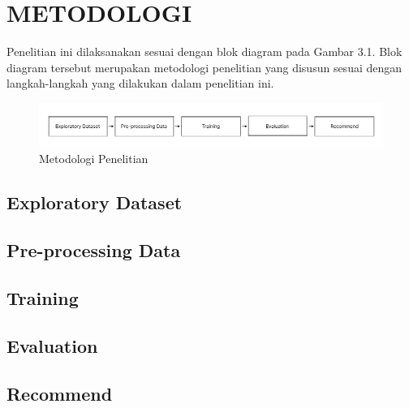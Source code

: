 \section{METODOLOGI}

Penelitian ini dilaksanakan sesuai dengan blok diagram pada Gambar 3.1. Blok diagram tersebut
merupakan metodologi penelitian yang disusun sesuai dengan langkah-langkah yang dilakukan dalam penelitian ini.

\begin{figure} [ht] \centering
  \includegraphics[width=160mm]{gambar/metodologi.png}
  \caption{Metodologi Penelitian}
\end{figure}


\subsection{Exploratory Dataset}
\lipsum[14]

\subsection{Pre-processing Data}
\lipsum[14]

\subsection{Training}
\lipsum[14]

\subsection{Evaluation}
\lipsum[14]

\subsection{Recommend}
\lipsum[14]

